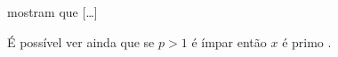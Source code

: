 \documentclass{article}
\begin{document}
\textcite{Boyce2010} mostram que [\ldots]

É possível ver ainda que se $p > 1$ é ímpar
então $x$ é primo \cite{Valente1999,Boyce2010}.

\printbibliography
\end{document}

